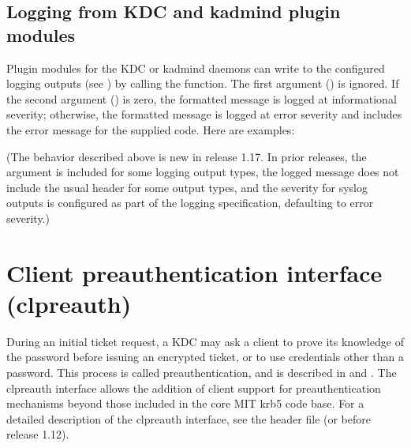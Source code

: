 \documentclass[letterpaper,10pt,english]{sphinxmanual}
\begin{document}
\subsection{Logging from KDC and kadmind plugin modules}
\label{\detokenize{plugindev/general:logging-from-kdc-and-kadmind-plugin-modules}}
Plugin modules for the KDC or kadmind daemons can write to the
configured logging outputs (see ) by calling the
 function.  The first argument () is ignored.  If
the second argument () is zero, the formatted message is logged
at informational severity; otherwise, the formatted message is logged
at error severity and includes the error message for the supplied
code.  Here are examples:

%
\begin{sphinxVerbatim}[commandchars=\\\{\}]
   
  
\end{sphinxVerbatim}

(The behavior described above is new in release 1.17.  In prior
releases, the  argument is included for some logging output
types, the logged message does not include the usual header for some
output types, and the severity for syslog outputs is configured as
part of the logging specification, defaulting to error severity.)


\section{Client preauthentication interface (clpreauth)}
\label{\detokenize{plugindev/clpreauth:client-preauthentication-interface-clpreauth}}\label{\detokenize{plugindev/clpreauth::doc}}
During an initial ticket request, a KDC may ask a client to prove its
knowledge of the password before issuing an encrypted ticket, or to
use credentials other than a password.  This process is called
preauthentication, and is described in  and .
The clpreauth interface allows the addition of client support for
preauthentication mechanisms beyond those included in the core MIT
krb5 code base.  For a detailed description of the clpreauth
interface, see the header file  (or
 before release 1.12).
\end{document}
